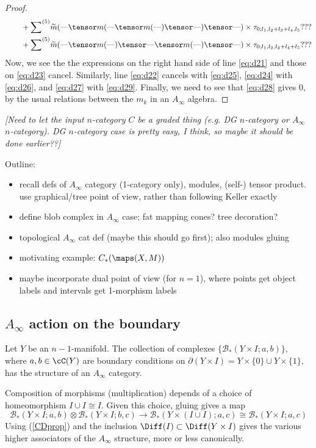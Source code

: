 \documentclass[11pt,leqno]{amsart}
\def\bc{{\mathcal B}}
\def\bd{\partial}
\def\sub{\subset}
\def\nn#1{{{\it \small [#1]}}}
\newcommand{\eq}[1]{\begin{displaymath}#1\end{displaymath}}
\begin{document}
\begin{proof}
\begin{align}
\label{eq:d28} & \qquad + \ssum{5} \tm(\T \tensor m(\T \tensor m(\T) \tensor \T) \tensor \T) \times \tau_{0;l_1,l_2+l_3+l_4,l_5} ??? \\
\label{eq:d29} & \qquad + \ssum{5} \tm(\T \tensor m(\T) \tensor \T \tensor m(\T) \tensor \T) \times \tau_{0;l_1,l_2,l_3+l_4+l_5} ???
\end{align}
Now, we see the the expressions on the right hand side of line \eqref{eq:d21} and those on \eqref{eq:d23} cancel. Similarly, line \eqref{eq:d22} cancels
with \eqref{eq:d25}, \eqref{eq:d24} with \eqref{eq:d26}, and \eqref{eq:d27} with \eqref{eq:d29}. Finally, we need to see that \eqref{eq:d28} gives $0$,
by the usual relations between the $m_k$ in an $A_\infty$ algebra.
\end{proof}

\nn{Need to let the input $n$-category $C$ be a graded thing (e.g. DG
$n$-category or $A_\infty$ $n$-category). DG $n$-category case is pretty
easy, I think, so maybe it should be done earlier??}

\bigskip

Outline:
\begin{itemize}
\item recall defs of $A_\infty$ category (1-category only), modules, (self-) tensor product.
use graphical/tree point of view, rather than following Keller exactly
\item define blob complex in $A_\infty$ case; fat mapping cones?  tree decoration?
\item topological $A_\infty$ cat def (maybe this should go first); also modules gluing
\item motivating example: $C_*(\maps(X, M))$
\item maybe incorporate dual point of view (for $n=1$), where points get
object labels and intervals get 1-morphism labels
\end{itemize}


\subsection{$A_\infty$ action on the boundary}
\label{sec:boundary-action}%
Let $Y$ be an $n{-}1$-manifold.
The collection of complexes $\{\bc_*(Y\times I; a, b)\}$, where $a, b \in \cC(Y)$ are boundary
conditions on $\bd(Y\times I) = Y\times \{0\} \cup Y\times\{1\}$, has the structure
of an $A_\infty$ category.

Composition of morphisms (multiplication) depends of a choice of homeomorphism
$I\cup I \cong I$.  Given this choice, gluing gives a map
\eq{
    \bc_*(Y\times I; a, b) \otimes \bc_*(Y\times I; b, c) \to \bc_*(Y\times (I\cup I); a, c)
            \cong \bc_*(Y\times I; a, c)
}
Using (\ref{CDprop}) and the inclusion $\Diff(I) \sub \Diff(Y\times I)$ gives the various
higher associators of the $A_\infty$ structure, more or less canonically.
\end{document}
